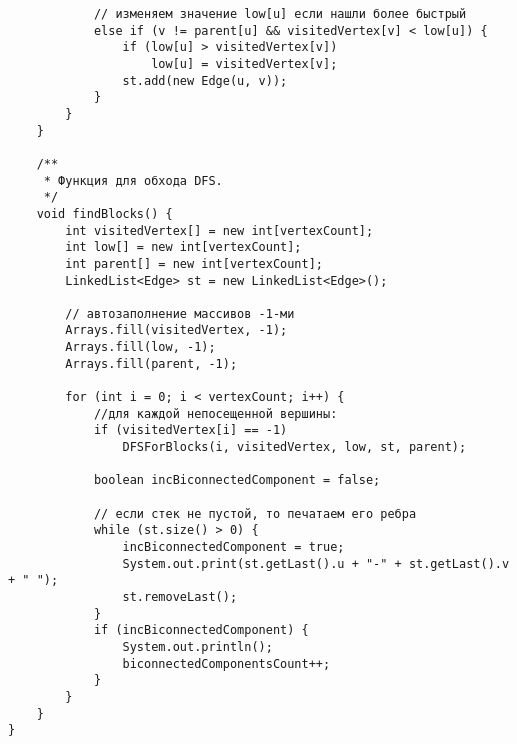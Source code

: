 \begin{verbatim}
            // изменяем значение low[u] если нашли более быстрый
            else if (v != parent[u] && visitedVertex[v] < low[u]) {
                if (low[u] > visitedVertex[v])
                    low[u] = visitedVertex[v];
                st.add(new Edge(u, v));
            }
        }
    }

    /**
     * Функция для обхода DFS.
     */
    void findBlocks() {
        int visitedVertex[] = new int[vertexCount];
        int low[] = new int[vertexCount];
        int parent[] = new int[vertexCount];
        LinkedList<Edge> st = new LinkedList<Edge>();

        // автозаполнение массивов -1-ми
        Arrays.fill(visitedVertex, -1);
        Arrays.fill(low, -1);
        Arrays.fill(parent, -1);

        for (int i = 0; i < vertexCount; i++) {
            //для каждой непосещенной вершины:
            if (visitedVertex[i] == -1)
                DFSForBlocks(i, visitedVertex, low, st, parent);

            boolean incBiconnectedComponent = false;

            // если стек не пустой, то печатаем его ребра
            while (st.size() > 0) {
                incBiconnectedComponent = true;
                System.out.print(st.getLast().u + "-" + st.getLast().v + " ");
                st.removeLast();
            }
            if (incBiconnectedComponent) {
                System.out.println();
                biconnectedComponentsCount++;
            }
        }
    }
}
	\end{verbatim}
